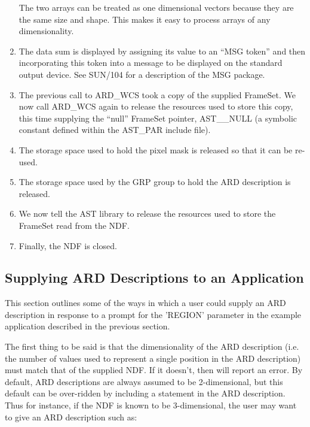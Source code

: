\begin{enumerate}
The two arrays can be treated as one dimensional vectors because they are the
same size and shape. This makes it easy to process arrays of any dimensionality.


\item The data sum is displayed by assigning its value to an ``MSG token'' and 
then incorporating this token into a message to be displayed on the standard 
output device. See SUN/104 for a description of the MSG package.

\item The previous call to ARD\_WCS took a copy of the supplied FrameSet.
We now call ARD\_WCS again to release the resources used to store this copy,
this time supplying the ``null'' FrameSet pointer, AST\_\_NULL (a symbolic 
constant defined within the AST\_PAR include file). 

\item The storage space used to hold the pixel mask is released so that it can 
be re-used.

\item The storage space used by the GRP group to hold the ARD description is 
released.

\item We now tell the AST library to release the resources used to store
the FrameSet read from the NDF.

\item Finally, the NDF is closed.
\end{enumerate}

\subsection{Supplying ARD Descriptions to an Application}
This section outlines some of the ways in which a user could supply an ARD
description in response to a prompt for the 'REGION' parameter in the example
application described in the previous section. 

The first thing to be said is that the dimensionality of the ARD description
(i.e. the number of values used to represent a single position in the ARD
description) must match that of the supplied NDF. If it
doesn't, then  will report an error. By default, ARD descriptions are
always assumed to be 2-dimensional, but this default can be over-ridden by
including a  statement in the ARD description. Thus for instance, if 
the NDF is known to be 3-dimensional, the user may want to give an ARD 
description such as:

